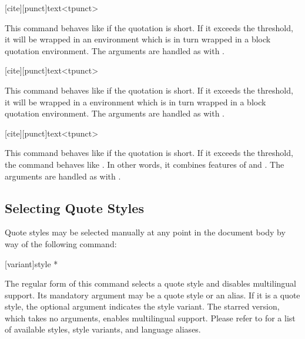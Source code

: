 \documentclass{ltxdockit}[2010/09/26]
\begin{document}
\begin{ltxsyntax}

[cite][punct]{text}<tpunct>

This command behaves like  if the quotation is short. If it exceeds the threshold, it will be wrapped in an  environment which is in turn wrapped in a block quotation environment. The arguments are handled as with .

[cite][punct]{text}<tpunct>

This command behaves like  if the quotation is short. If it exceeds the threshold, it will be wrapped in a  environment which is in turn wrapped in a block quotation environment. The arguments are handled as with .

[cite][punct]{text}<tpunct>

This command behaves like  if the quotation is short. If it exceeds the threshold, the command behaves like . In other words, it combines features of  and . The arguments are handled as with .

\end{ltxsyntax}

\subsection{Selecting Quote Styles}
\label{bas:set}

Quote styles may be selected manually at any point in the document body by way of the following command:

\begin{ltxsyntax}

[variant]{style}
*

The regular form of this command selects a quote style and disables multilingual support. Its mandatory argument may be a quote style or an alias. If it is a quote style, the optional argument indicates the style variant. The starred version, which takes no arguments, enables multilingual support. Please refer to  for a list of available styles, style variants, and language aliases.

\end{ltxsyntax}
\end{document}
